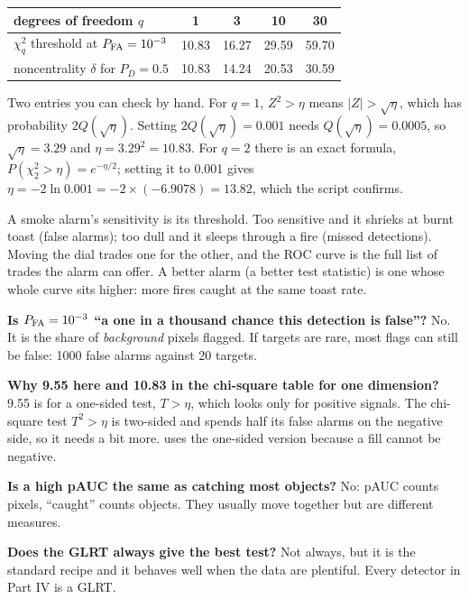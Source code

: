 \documentclass[11pt,a4paper,oneside,openany]{book}
\begin{document}
\begin{center}
\begin{tabular}{@{}lcccc@{}}
\toprule
degrees of freedom $q$ & 1 & 3 & 10 & 30\\
\midrule
$\chi^2_q$ threshold at $P_{\rm FA}=10^{-3}$ & 10.83 & 16.27 & 29.59 & 59.70\\
noncentrality $\delta$ for $P_D=0.5$ & 10.83 & 14.24 & 20.53 & 30.59\\
\bottomrule
\end{tabular}
\end{center}

Two entries you can check by hand. For $q=1$, $Z^2>\eta$ means $|Z|>\sqrt\eta$, which has probability $2Q(\sqrt\eta)$. Setting
$2Q(\sqrt\eta)=0.001$ needs $Q(\sqrt\eta)=0.0005$, so $\sqrt\eta=3.29$ and $\eta=3.29^2=10.83$. For $q=2$ there is an exact formula,
$P(\chi^2_2>\eta)=e^{-\eta/2}$; setting it to 0.001 gives $\eta=-2\ln0.001=-2\times(-6.9078)=13.82$, which the script confirms.

\begin{analogy}
A smoke alarm's sensitivity is its threshold. Too sensitive and it shrieks at burnt toast (false alarms); too dull and it sleeps
through a fire (missed detections). Moving the dial trades one for the other, and the ROC curve is the full list of trades the
alarm can offer. A better alarm (a better test statistic) is one whose whole curve sits higher: more fires caught at the same
toast rate.
\end{analogy}

\begin{confusions}
\textbf{Is $P_{\rm FA}=10^{-3}$ ``a one in a thousand chance this detection is false''?} No. It is the share of \emph{background}
pixels flagged. If targets are rare, most flags can still be false: 1000 false alarms against 20 targets.

\textbf{Why 9.55 here and 10.83 in the chi-square table for one dimension?} 9.55 is for a one-sided test, $T>\eta$, which looks only
for positive signals. The chi-square test $T^2>\eta$ is two-sided and spends half its false alarms on the negative side, so it
needs a bit more.  uses the one-sided version because a fill cannot be negative.

\textbf{Is a high pAUC the same as catching most objects?} No: pAUC counts pixels, ``caught'' counts objects. They usually move
together but are different measures.

\textbf{Does the GLRT always give the best test?} Not always, but it is the standard recipe and it behaves well when the data are
plentiful. Every detector in Part IV is a GLRT.
\end{confusions}
\end{document}
